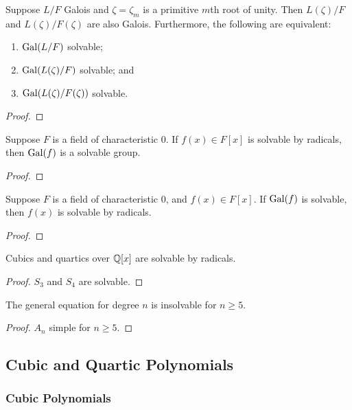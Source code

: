 \begin{lemma}
    Suppose \(L/F\) Galois and \(\zeta = \zeta_m\) is a primitive \(m\)th root of unity.
    Then \(L(\zeta)/F\) and \(L(\zeta)/F(\zeta)\) are also Galois.
    Furthermore, the following are equivalent:
    \begin{enumerate}[label={(\alph*)}, itemsep=0mm]
        \item \(\operatorname{Gal}(L/F)\) solvable;
        \item \(\operatorname{Gal}(L(\zeta)/F)\) solvable; and
        \item \(\operatorname{Gal}(L(\zeta)/F(\zeta))\) solvable.
    \end{enumerate}
\end{lemma}
\begin{proof}
\end{proof}

\begin{theorem}
    Suppose \(F\) is a field of characteristic 0.
    If \(f(x) \in F[x]\) is solvable by radicals,
    then \(\operatorname{Gal}(f)\) is a solvable group.
\end{theorem}
\begin{proof}
\end{proof}
\begin{theorem}[Galois]
    Suppose \(F\) is a field of characteristic 0,
    and \(f(x) \in F[x]\).
    If \(\operatorname{Gal}(f)\) is solvable, then \(f(x)\) is solvable by radicals.
\end{theorem}
\begin{proof}
\end{proof}
\begin{corollary}
    Cubics and quartics over \(\mathbb{Q}[x]\) are solvable by radicals.
\end{corollary}
\begin{proof}
    \(S_3\) and \(S_4\) are solvable.
\end{proof}
\begin{corollary}
    The general equation for degree \(n\) is insolvable for \(n \geq 5\).
\end{corollary}
\begin{proof}
    \(A_n\) simple for \(n \geq 5\).
\end{proof}


\subsection{Cubic and Quartic Polynomials}

\subsubsection*{Cubic Polynomials}

